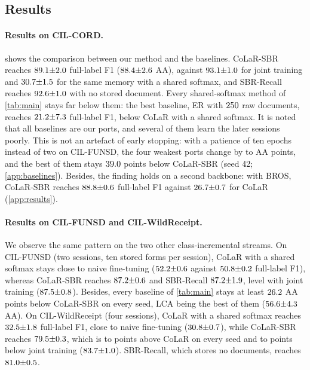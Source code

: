\documentclass[10pt,twocolumn,letterpaper]{article}
\begin{document}
\subsection{Results}
\label{sec:beyond}
\paragraph{Results on CIL-CORD.}  shows the comparison between our method and the baselines. CoLaR-SBR reaches $89.1{\pm}2.0$ full-label F1 ($88.4{\pm}2.6$ AA), against $93.1{\pm}1.0$ for joint training and $30.7{\pm}1.5$ for the same memory with a shared softmax, and SBR-Recall reaches $92.6{\pm}1.0$ with no stored document. Every shared-softmax method of \cref{tab:main} stays far below them: the best baseline, ER with $250$ raw documents, reaches $21.2{\pm}7.3$ full-label F1, below CoLaR with a shared softmax. It is noted that all baselines are our ports, and several of them learn the later sessions poorly. This is not an artefact of early stopping: with a patience of ten epochs instead of two on CIL-FUNSD, the four weakest ports change by \nProbeDeltaMin{} to \nProbeDeltaMax{} AA points, and the best of them stays $39.0$ points below CoLaR-SBR (seed 42; \cref{app:baselines}). Besides, the finding holds on a second backbone: with BROS, CoLaR-SBR reaches $88.8{\pm}0.6$ full-label F1 against $26.7{\pm}0.7$ for CoLaR (\cref{app:results}).

\paragraph{Results on CIL-FUNSD and CIL-WildReceipt.} We observe the same pattern on the two other class-incremental streams. On CIL-FUNSD (two sessions, ten stored forms per session), CoLaR with a shared softmax stays close to naive fine-tuning ($52.2{\pm}0.6$ against $50.8{\pm}0.2$ full-label F1), whereas CoLaR-SBR reaches $87.2{\pm}0.6$ and SBR-Recall $87.2{\pm}1.9$, level with joint training ($87.5{\pm}0.8$). Besides, every baseline of \cref{tab:main} stays at least $26.2$ AA points below CoLaR-SBR on every seed, LCA being the best of them ($56.6{\pm}4.3$ AA). On CIL-WildReceipt (four sessions), CoLaR with a shared softmax reaches $32.5{\pm}1.8$ full-label F1, close to naive fine-tuning ($30.8{\pm}0.7$), while CoLaR-SBR reaches $79.5{\pm}0.3$, which is \nWildSbrMinusColarFullMin{} to \nWildSbrMinusColarFullMax{} points above CoLaR on every seed and \nWildJointMinusSbrFullMin{} to \nWildJointMinusSbrFullMax{} points below joint training ($83.7{\pm}1.0$). SBR-Recall, which stores no documents, reaches $81.0{\pm}0.5$.
\end{document}
